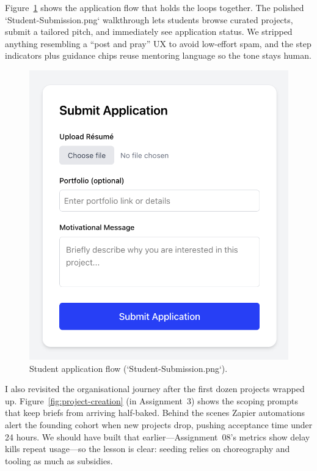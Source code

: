 Figure~\ref{fig:application-flow} shows the application flow that holds the loops together. The polished `Student-Submission.png` walkthrough lets students browse curated projects, submit a tailored pitch, and immediately see application status. We stripped anything resembling a ``post and pray'' UX to avoid low-effort spam, and the step indicators plus guidance chips reuse mentoring language so the tone stays human.

\begin{figure}[h]
  \centering
  \includegraphics[width=0.85\linewidth]{figures/Student-Submission.png}
  \caption{Student application flow (`Student-Submission.png`).}
  \label{fig:application-flow}
\end{figure}

I also revisited the organisational journey after the first dozen projects wrapped up. Figure~\ref{fig:project-creation} (in Assignment~3) shows the scoping prompts that keep briefs from arriving half-baked. Behind the scenes Zapier automations alert the founding cohort when new projects drop, pushing acceptance time under 24 hours. We should have built that earlier---Assignment~08's metrics show delay kills repeat usage---so the lesson is clear: seeding relies on choreography and tooling as much as subsidies.
